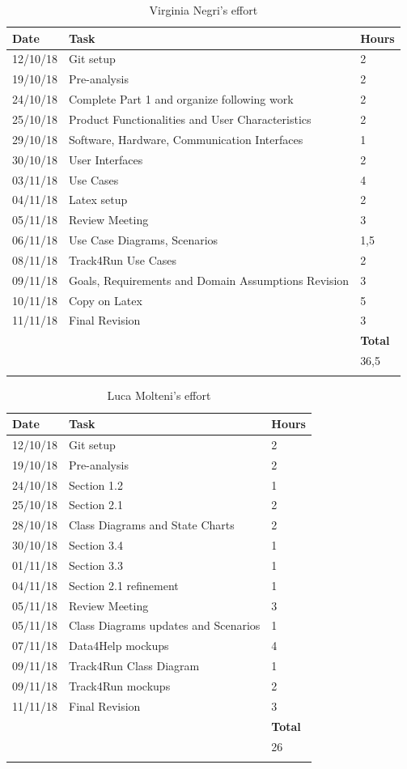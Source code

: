 \documentclass[titlepage]{article}
\begin{document}
		
	\begin{longtable}{| p{2 cm} | p{5 cm} | p{2 cm} |} 
			\hline
			{\bf Date} & {\bf Task} & {\bf Hours}\\
			\hline
			12/10/18 & Git setup & 2 \\
			19/10/18 & Pre-analysis & 2 \\
			24/10/18 & Complete Part 1 and organize following work & 2 \\
			25/10/18 & Product Functionalities and User Characteristics& 2 \\
			29/10/18 & Software, Hardware, Communication Interfaces & 1 \\
			30/10/18 & User Interfaces & 2 \\
			03/11/18 & Use Cases & 4 \\
			04/11/18 & Latex setup & 2 \\
			05/11/18 & Review Meeting & 3 \\
			06/11/18 & Use Case Diagrams, Scenarios & 1,5\\
			08/11/18 & Track4Run Use Cases & 2 \\
			09/11/18 & Goals, Requirements and Domain Assumptions Revision & 3 \\
			10/11/18 & Copy on Latex & 5 \\
			11/11/18 & Final Revision & 3 \\
			\hline
			& & {\bf Total} \\
			\hline
			& & 36,5 \\
			\hline
			\caption{Virginia Negri's effort}
		\end{longtable}
	
		\begin{longtable}{| p{2 cm} | p{5 cm} | p{2 cm} |} 
		\hline
		{\bf Date} & {\bf Task} & {\bf Hours}\\
		\hline
		12/10/18 & Git setup & 2 \\
		19/10/18 & Pre-analysis & 2 \\
		24/10/18 & Section 1.2 & 1 \\
		25/10/18 & Section 2.1 & 2 \\
		28/10/18 & Class Diagrams and State Charts & 2 \\
		30/10/18 & Section 3.4 & 1 \\
		01/11/18 & Section 3.3 & 1 \\
		04/11/18 & Section 2.1 refinement & 1 \\
		05/11/18 & Review Meeting & 3 \\
		05/11/18 & Class Diagrams updates and Scenarios & 1\\
		07/11/18 & Data4Help mockups & 4 \\
		09/11/18 & Track4Run Class Diagram & 1 \\
		09/11/18 & Track4Run mockups & 2 \\
		11/11/18 & Final Revision & 3 \\
		\hline
		& & {\bf Total} \\
		\hline
		& & 26 \\
		\hline
		\caption{Luca Molteni's effort}
	\end{longtable}
	
\end{document}
